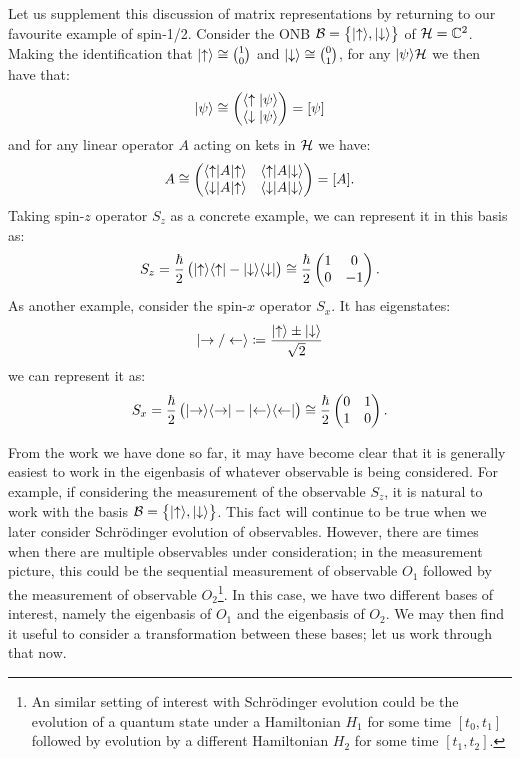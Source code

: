 Let us supplement this discussion of matrix representations by returning to our favourite example of spin-1/2. Consider the ONB $\mathcal{B} = \set{\lvert \uparrow \rangle, \lvert \downarrow \rangle}$ of $\mathcal{H} = \mathbb{C}^2$. Making the identification that $\lvert \uparrow \rangle \cong \binom{1}{0}$ and $\lvert \downarrow \rangle \cong \binom{0}{1}$, for any $\lvert \psi \rangle \mathcal{H}$ we then have that:
\begin{equation}
    \lvert \psi \rangle \cong \begin{pmatrix} \langle \uparrow \lvert \psi \rangle \\ \langle \downarrow \lvert \psi \rangle \end{pmatrix} = [\psi]
\end{equation}
and for any linear operator $A$ acting on kets in $\mathcal{H}$ we have:
\begin{equation}
    A \cong \begin{pmatrix} \langle \uparrow \rvert A\lvert \uparrow \rangle & \langle \uparrow \rvert A\lvert \downarrow \rangle \\ \langle \downarrow \rvert A\lvert \uparrow \rangle & \langle \downarrow \rvert A\lvert \downarrow \rangle \end{pmatrix} = [A].
\end{equation}
Taking spin-$z$ operator $S_z$ as a concrete example, we can represent it in this basis as:
\begin{equation}
    S_z = \frac{\hbar}{2}\left(\lvert \uparrow \rangle \langle \uparrow \rvert - \lvert \downarrow \rangle \langle \downarrow \rvert\right) \cong \frac{\hbar}{2}\begin{pmatrix} 1 & 0 \\ 0 & -1 \end{pmatrix}.
\end{equation}
As another example, consider the spin-$x$ operator $S_x$. It has eigenstates:
\begin{equation}
    \lvert \rightarrow/\leftarrow \rangle \coloneqq \frac{\lvert \uparrow \rangle \pm \lvert \downarrow \rangle}{\sqrt{2}}
\end{equation}
we can represent it as:
\begin{equation}
    S_x = \frac{\hbar}{2}\left(\lvert \rightarrow \rangle \langle \rightarrow \rvert - \lvert \leftarrow \rangle \langle \leftarrow \rvert\right) \cong \frac{\hbar}{2}\begin{pmatrix} 0 & 1 \\ 1 & 0 \end{pmatrix}.
\end{equation}

From the work we have done so far, it may have become clear that it is generally easiest to work in the eigenbasis of whatever observable is being considered. For example, if considering the measurement of the observable $S_z$, it is natural to work with the basis $\mathcal{B} = \set{\lvert \uparrow \rangle, \lvert \downarrow \rangle}$. This fact will continue to be true when we later consider Schr\"{o}dinger evolution of observables. However, there are times when there are multiple observables under consideration; in the measurement picture, this could be the sequential measurement of observable $O_1$ followed by the measurement of observable $O_2$\footnote{An similar setting of interest with Schr\"{o}dinger evolution could be the evolution of a quantum state under a Hamiltonian $H_1$ for some time $[t_0, t_1]$ followed by evolution by a different Hamiltonian $H_2$ for some time $[t_1, t_2]$.}. In this case, we have two different bases of interest, namely the eigenbasis of $O_1$ and the eigenbasis of $O_2$. We may then find it useful to consider a transformation between these bases; let us work through that now. 


